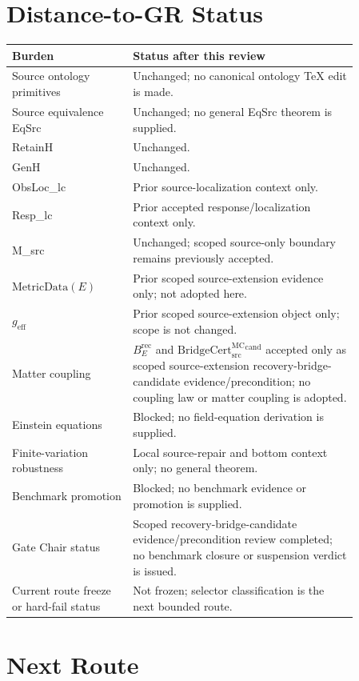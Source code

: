 \documentclass[11pt]{article}
\newcommand{\geff}{g_{\mathrm{eff}}}
\newcommand{\MetricData}{\mathrm{MetricData}}
\newcommand{\BridgeCert}{\mathrm{BridgeCert}_{\mathrm{src}}^{\mathrm{MC}}}
\newcommand{\BErec}{B_E^{\mathrm{rec}}}
\begin{document}
\section{Distance-to-GR Status}

\begin{longtable}{p{0.30\linewidth}p{0.56\linewidth}}
\toprule
Burden & Status after this review \\
\midrule
Source ontology primitives & Unchanged; no canonical ontology TeX edit is made. \\
Source equivalence EqSrc & Unchanged; no general EqSrc theorem is supplied. \\
RetainH & Unchanged. \\
GenH & Unchanged. \\
ObsLoc\_lc & Prior source-localization context only. \\
Resp\_lc & Prior accepted response/localization context only. \\
M\_src & Unchanged; scoped source-only boundary remains previously accepted. \\
\(\MetricData(E)\) & Prior scoped source-extension evidence only; not adopted here. \\
\(\geff\) & Prior scoped source-extension object only; scope is not changed. \\
Matter coupling & \(\BErec\) and \(\BridgeCert^{\mathrm{cand}}\) accepted only as scoped source-extension recovery-bridge-candidate evidence/precondition; no coupling law or matter coupling is adopted. \\
Einstein equations & Blocked; no field-equation derivation is supplied. \\
Finite-variation robustness & Local source-repair and bottom context only; no general theorem. \\
Benchmark promotion & Blocked; no benchmark evidence or promotion is supplied. \\
Gate Chair status & Scoped recovery-bridge-candidate evidence/precondition review completed; no benchmark closure or suspension verdict is issued. \\
Current route freeze or hard-fail status & Not frozen; selector classification is the next bounded route. \\
\bottomrule
\end{longtable}

\section{Next Route}
\end{document}
